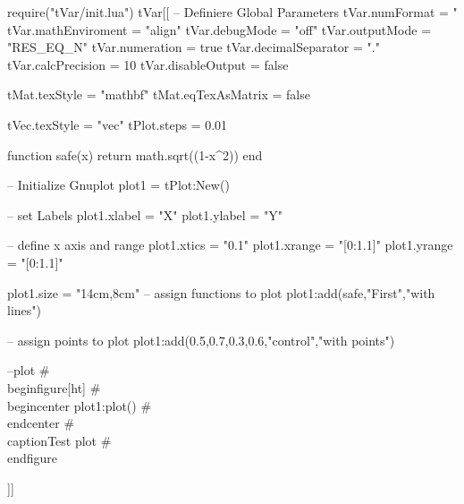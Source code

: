 \documentclass{article}
\begin{document}
 
\begin{luacode}
	require("tVar/init.lua")
tVar[[
-- Definiere Global Parameters
tVar.numFormat = "%
tVar.mathEnviroment = "align"
tVar.debugMode = "off"
tVar.outputMode = "RES_EQ_N"
tVar.numeration = true
tVar.decimalSeparator = "."
tVar.calcPrecision = 10
tVar.disableOutput = false

tMat.texStyle = "mathbf"
tMat.eqTexAsMatrix = false

tVec.texStyle = "vec"
tPlot.steps = 0.01

function safe(x)
return math.sqrt((1-x^2))
end

-- Initialize Gnuplot
plot1 = tPlot:New()

-- set Labels
plot1.xlabel = "X"
plot1.ylabel = "Y"

-- define x axis and range
plot1.xtics = "0.1"
plot1.xrange = "[0:1.1]"
plot1.yrange = "[0:1.1]"

plot1.size = "14cm,8cm"
-- assign functions to plot
plot1:add(safe,"First","with lines")

-- assign points to plot
plot1:add({{0.5,0.7},{0.3,0.6}},"control","with points")

--plot
#\\begin{figure}[ht]
#\\begin{center}
plot1:plot()
#\\end{center}
#\\caption{Test plot}
#\\end{figure}

]]
\end{luacode}
\end{document}
